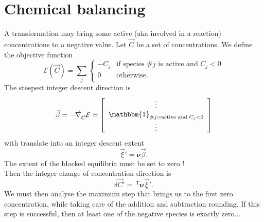 \documentclass[aps]{revtex4}
\newcommand{\mymat}[1]{\bm{#1}}
\newcommand{\mytrn}[1]{~^{\mathsf{T}}{#1}}
\begin{document}
\section{Chemical balancing}
A transformation may bring some active (aka involved in a reaction) concentrations to a negative value.
Let $\vec{C}$ be a set of concentrations. We define the objective function
$$
	\mathcal{E}(\vec{C}) = \sum_j 
	\left
	\lbrace
		\begin{array}{rl}
		-C_j & \text{if species \#}j\text{ is active and } C_j<0\\
		0    & \text{otherwise.}\\
		\end{array} 
	\right.
$$
The steepest integer descent direction is
$$
	\vec{\beta} = -\vec{\nabla}_{\vec{C}} \mathcal{E} = 
	\left\lbrack
		\begin{array}{c}
		\vdots\\
		\mathbbm{1}_{\text{\#}j=\text{active and } C_j<0}\\
		\vdots
		\end{array}
	\right\rbrack
$$
with translate into an integer descent extent
$$
	\vec{\xi}' = \mymat{\nu} \vec{\beta}.
$$
The extent of the blocked equilibria must be set to zero !\\
Then the integer change of concentration direction is
$$
	\delta\vec{C}' = \mytrn{\mymat{\nu}}\vec{\xi}'.
$$
We must then analyse the maximum step that brings us to the
first zero concentration, while taking care of the addition and subtraction rounding.
If this step is successful, then at least one of the negative species is exactly zero...
\end{document}
